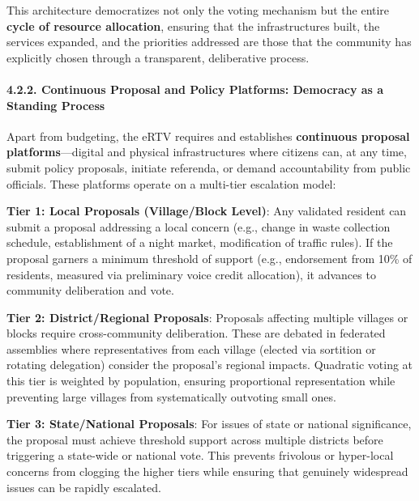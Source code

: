 This architecture democratizes not only the voting mechanism but the
entire \textbf{cycle of resource allocation}, ensuring that the
infrastructures built, the services expanded, and the priorities
addressed are those that the community has explicitly chosen through a
transparent, deliberative process.

\paragraph{4.2.2. Continuous Proposal and Policy Platforms: Democracy as
a Standing
Process}\label{continuous-proposal-and-policy-platforms-democracy-as-a-standing-process}

Apart from budgeting, the eRTV requires and establishes
\textbf{continuous proposal platforms}---digital and physical
infrastructures where citizens can, at any time, submit policy
proposals, initiate referenda, or demand accountability from public
officials. These platforms operate on a multi-tier escalation model:

\textbf{Tier 1: Local Proposals (Village/Block Level)}: Any validated
resident can submit a proposal addressing a local concern (e.g., change
in waste collection schedule, establishment of a night market,
modification of traffic rules). If the proposal garners a minimum
threshold of support (e.g., endorsement from 10\% of residents, measured
via preliminary voice credit allocation), it advances to community
deliberation and vote.

\textbf{Tier 2: District/Regional Proposals}: Proposals affecting
multiple villages or blocks require cross-community deliberation. These
are debated in federated assemblies where representatives from each
village (elected via sortition or rotating delegation) consider the
proposal's regional impacts. Quadratic voting at this tier is weighted
by population, ensuring proportional representation while preventing
large villages from systematically outvoting small ones.

\textbf{Tier 3: State/National Proposals}: For issues of state or
national significance, the proposal must achieve threshold support
across multiple districts before triggering a state-wide or national
vote. This prevents frivolous or hyper-local concerns from clogging the
higher tiers while ensuring that genuinely widespread issues can be
rapidly escalated.

